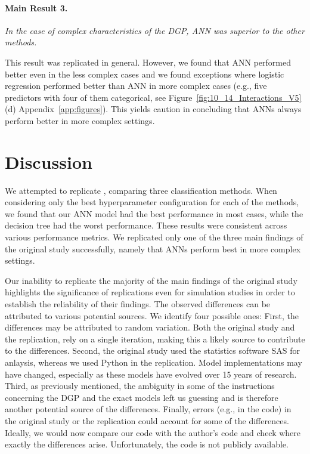 \documentclass[12pt]{article}
\begin{document}
    \paragraph{Main Result 3.}
    \textit{In the case of complex characteristics of the DGP, ANN was superior to the other methods.}

    This result was replicated in general. However, we found that ANN performed better even in the less complex cases and we found exceptions where logistic regression performed better than ANN in more complex cases (e.g., five predictors with four of them categorical, see Figure~\ref{fig:10_14_Interactions_V5} (d) Appendix~\ref{app:figures}). This yields caution in concluding that ANNs always perform better in more complex settings.
    
\section{Discussion}

We attempted to replicate \textcite{kim:10}, comparing three classification methods. When considering only the best hyperparameter configuration for each of the methods, we found that our ANN model had the best performance in most cases, while the decision tree had the worst performance. These results were consistent across various performance metrics. We replicated only one of the three main findings of the original study successfully, namely that ANNs perform best in more complex settings. 

Our inability to replicate the majority of the main findings of the original study highlights the significance of replications even for simulation studies in order to establish the reliability of their findings. The observed differences can be attributed to various potential sources. We identify four possible ones: First, the differences may be attributed to random variation. Both the original study and the replication, rely on a single iteration, making this a likely source to contribute to the differences. Second, the original study used the statistics software SAS for anlaysis, whereas we used Python in the replication. Model implementations may have changed, especially as these models have evolved over 15 years of research. Third, as previously mentioned, the ambiguity in some of the instructions concerning the DGP and the exact models left us guessing and is therefore another potential source of the differences. Finally, errors (e.g., in the code) in the original study or the replication could account for some of the differences. Ideally, we would now compare our code with the author's code and check where exactly the differences arise. Unfortunately, the code is not publicly available.
\end{document}
